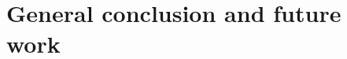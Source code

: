 
\chapter{General conclusion and future work}  %

\ifpdf
    \graphicspath{{Chapter11/Figs/Raster/}{Chapter11/Figs/PDF/}{Chapter11/Figs/}}
\else
    \graphicspath{{Chapter11/Figs/Vector/}{Chapter11/Figs/}}
\fi






